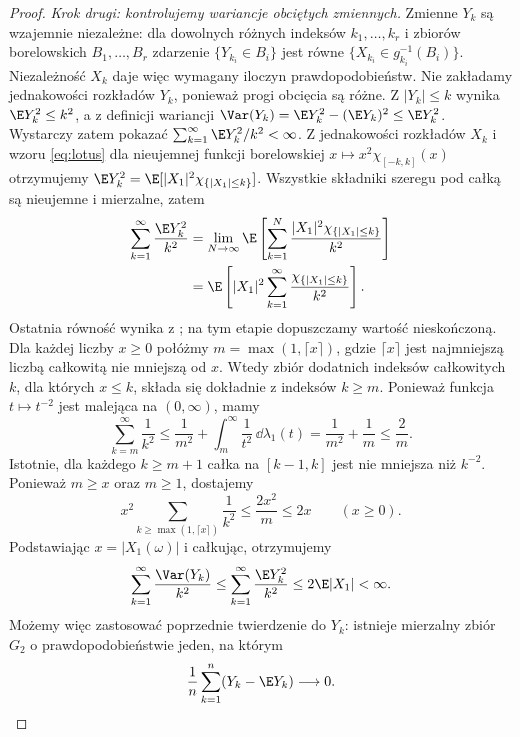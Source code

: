 \begin{proof}
\emph{Krok drugi: kontrolujemy wariancje obciętych
zmiennych.} Zmienne $Y_k$ są wzajemnie niezależne:
dla dowolnych różnych indeksów $k_1,\ldots,k_r$
i zbiorów borelowskich $B_1,\ldots,B_r$ zdarzenie
$\{Y_{k_i}\in B_i\}$ jest równe
$\{X_{k_i}\in g_{k_i}^{-1}(B_i)\}$.
Niezależność $X_k$ daje więc wymagany iloczyn
prawdopodobieństw. Nie zakładamy jednakowości
rozkładów $Y_k$, ponieważ progi obcięcia są różne.
Z $|Y_k|\leq k$ wynika $\E Y_k^2\leq k^2$,
a z definicji wariancji
$\Var(Y_k)=\E Y_k^2-(\E Y_k)^2\leq\E Y_k^2$.
Wystarczy zatem pokazać
$\sum_{k=1}^\infty\E Y_k^2/k^2<\infty$.
Z jednakowości rozkładów $X_k$ i wzoru \eqref{eq:lotus}
dla nieujemnej funkcji borelowskiej
$x\mapsto x^2\chi_{[-k,k]}(x)$ otrzymujemy
$\E Y_k^2=\E[|X_1|^2\chi_{\{|X_1|\leq k\}}]$.
Wszystkie składniki szeregu pod całką są nieujemne
i mierzalne, zatem
\[
\begin{aligned}
\sum_{k=1}^\infty\frac{\E Y_k^2}{k^2}
&=\lim_{N\to\infty}\E\left[
\sum_{k=1}^{N}\frac{|X_1|^2\chi_{\{|X_1|\leq k\}}}{k^2}
\right]\\
&=\E\left[|X_1|^2
\sum_{k=1}^\infty\frac{\chi_{\{|X_1|\leq k\}}}{k^2}\right].
\end{aligned}
\]
Ostatnia równość wynika z
;
na tym etapie dopuszczamy wartość nieskończoną.
Dla każdej liczby $x\geq0$ połóżmy
$m=\max(1,\lceil x\rceil)$, gdzie $\lceil x\rceil$
jest najmniejszą liczbą całkowitą nie mniejszą od $x$.
Wtedy zbiór dodatnich indeksów całkowitych $k$,
dla których $x\leq k$, składa się dokładnie
z indeksów $k\geq m$.
Ponieważ funkcja $t\mapsto t^{-2}$ jest malejąca
na $(0,\infty)$, mamy
\[
\sum_{k=m}^\infty\frac1{k^2}
\leq \frac1{m^2}+\int_m^\infty\frac1{t^2}\,\dd\lambda_1(t)
=\frac1{m^2}+\frac1m\leq\frac2m.
\]
Istotnie, dla każdego $k\geq m+1$ całka na
$[k-1,k]$ jest nie mniejsza niż $k^{-2}$.
Ponieważ $m\geq x$ oraz $m\geq1$, dostajemy
\[
x^2\sum_{k\geq\max(1,\lceil x\rceil)}\frac1{k^2}
\leq\frac{2x^2}{m}\leq2x
\qquad (x\geq0).
\]
Podstawiając $x=|X_1(\omega)|$ i całkując, otrzymujemy
\[
\sum_{k=1}^\infty\frac{\Var(Y_k)}{k^2}
\leq\sum_{k=1}^\infty\frac{\E Y_k^2}{k^2}
\leq2\E|X_1|<\infty.
\] Możemy więc zastosować
poprzednie twierdzenie do $Y_k$: istnieje mierzalny
zbiór $G_2$ o prawdopodobieństwie jeden, na którym
\[
\frac1n\sum_{k=1}^n(Y_k-\E Y_k)\longrightarrow0.
\]


\end{proof}
